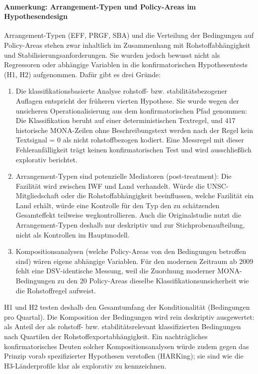 \paragraph{Anmerkung: Arrangement-Typen und Policy-Areas im Hypothesendesign}
Arrangement-Typen (EFF, PRGF, SBA) und die Verteilung der Bedingungen auf Policy-Areas stehen zwar inhaltlich im Zusammenhang mit Rohstoffabhängigkeit und Stabilisierungsanforderungen. Sie wurden jedoch bewusst nicht als Regressoren oder abhängige Variablen in die konfirmatorischen Hypothesentests (H1, H2) aufgenommen. Dafür gibt es drei Gründe:
\begin{enumerate}
  \item Die klassifikationsbasierte Analyse rohstoff- bzw. stabilitätsbezogener Auflagen entspricht der früheren vierten Hypothese. Sie wurde wegen der unsicheren Operationalisierung aus dem konfirmatorischen Pfad genommen: Die Klassifikation beruht auf einer deterministischen Textregel, und 417 historische MONA-Zeilen ohne Beschreibungstext werden nach der Regel \glqq kein Textsignal = 0\grqq{} als nicht rohstoffbezogen kodiert. Eine Messregel mit dieser Fehleranfälligkeit trägt keinen konfirmatorischen Test und wird ausschließlich explorativ berichtet.
  \item Arrangement-Typen sind potenzielle Mediatoren (post-treatment): Die Fazilität wird zwischen IWF und Land verhandelt. Würde die UNSC-Mitgliedschaft oder die Rohstoffabhängigkeit beeinflussen, welche Fazilität ein Land erhält, würde eine Kontrolle für den Typ den zu schätzenden Gesamteffekt teilweise wegkontrollieren. Auch die Originalstudie nutzt die Arrangement-Typen deshalb nur deskriptiv und zur Stichprobenaufteilung, nicht als Kontrollen im Hauptmodell.
  \item Kompositionsanalysen (welche Policy-Areas von den Bedingungen betroffen sind) wären eigene abhängige Variablen. Für den modernen Zeitraum ab 2009 fehlt eine DSV-identische Messung, weil die Zuordnung moderner MONA-Bedingungen zu den 20 Policy-Areas dieselbe Klassifikationsunsicherheit wie die Rohstoffregel aufweist.
\end{enumerate}
H1 und H2 testen deshalb den Gesamtumfang der Konditionalität (Bedingungen pro Quartal). Die Komposition der Bedingungen wird rein deskriptiv ausgewertet: als Anteil der als rohstoff- bzw. stabilitätsrelevant klassifizierten Bedingungen nach Quartilen der Rohstoffexportabhängigkeit. Ein nachträgliches konfirmatorisches Deuten solcher Kompositionsanalysen würde zudem gegen das Prinzip vorab spezifizierter Hypothesen verstoßen (HARKing); sie sind wie die H3-Länderprofile klar als explorativ zu kennzeichnen.

